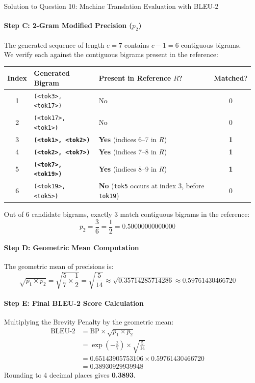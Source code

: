 \documentclass[11pt,a4paper]{article}
\begin{document}
\begin{solutionbox}{Solution to Question 10: Machine Translation Evaluation with BLEU-2}
\paragraph{Step C: 2-Gram Modified Precision ($p_2$)}
The generated sequence of length $c = 7$ contains $c - 1 = 6$ contiguous bigrams. We verify each against the contiguous bigrams present in the reference:
\begin{center}
\begin{tabular}{cllc}
\toprule
\textbf{Index} & \textbf{Generated Bigram} & \textbf{Present in Reference $R$?} & \textbf{Matched?} \\
\midrule
1 & \texttt{(<tok3>, <tok17>)} & No & 0 \\
2 & \texttt{(<tok17>, <tok1>)} & No & 0 \\
3 & \textbf{\texttt{(<tok1>, <tok2>)}} & \textbf{Yes} (indices 6--7 in $R$) & \textbf{1} \\
4 & \textbf{\texttt{(<tok2>, <tok7>)}} & \textbf{Yes} (indices 7--8 in $R$) & \textbf{1} \\
5 & \textbf{\texttt{(<tok7>, <tok19>)}} & \textbf{Yes} (indices 8--9 in $R$) & \textbf{1} \\
6 & \texttt{(<tok19>, <tok5>)} & \textbf{No} (\texttt{tok5} occurs at index 3, before \texttt{tok19}) & 0 \\
\bottomrule
\end{tabular}
\end{center}
Out of 6 candidate bigrams, exactly 3 match contiguous bigrams in the reference:
\begin{equation*}
p_2 = \frac{3}{6} = \frac{1}{2} = \mathbf{0.50000000000000}
\end{equation*}

\paragraph{Step D: Geometric Mean Computation}
The geometric mean of precisions is:
\begin{equation*}
\sqrt{p_1 \times p_2} = \sqrt{\frac{5}{7} \times \frac{1}{2}} = \sqrt{\frac{5}{14}} \approx \sqrt{0.35714285714286} \approx \mathbf{0.59761430466720}
\end{equation*}

\paragraph{Step E: Final BLEU-2 Score Calculation}
Multiplying the Brevity Penalty by the geometric mean:
\begin{align*}
\text{BLEU-2} &= \text{BP} \times \sqrt{p_1 \times p_2} \\
&= \exp\left( -\frac{3}{7} \right) \times \sqrt{\frac{5}{14}} \\
&= 0.65143905753106 \times 0.59761430466720 \\
&= \mathbf{0.38930929939948}
\end{align*}
Rounding to 4 decimal places gives \textbf{0.3893}.


\end{solutionbox}
\end{document}
